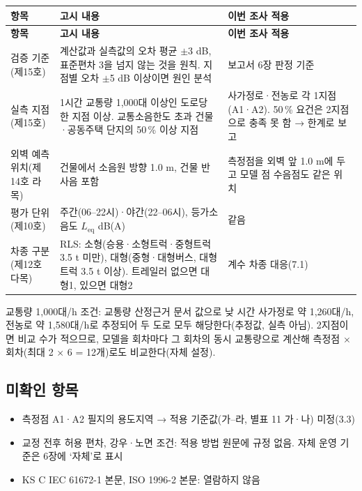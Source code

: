 \documentclass[10.5pt,a4paper]{article}
\newcommand{\hd}[1]{\cellcolor{headfill}\textbf{\sffamily #1}}
\newcommand{\notebox}[2][lab]{\par\noindent\colorbox{#1}{\parbox{\dimexpr\linewidth-2\fboxsep}{\small #2}}\par}
\begin{document}
\footnotesize
\begin{longtable}{>{\raggedright\arraybackslash}p{}>{\raggedright\arraybackslash}p{}>{\raggedright\arraybackslash}p{}}
\toprule
\hd{항목} & \hd{고시 내용} & \hd{이번 조사 적용} \\ \midrule
\endfirsthead
\toprule
\hd{항목} & \hd{고시 내용} & \hd{이번 조사 적용} \\ \midrule
\endhead
\bottomrule
\endlastfoot
검증 기준(제15호) & 계산값과 실측값의 오차 평균 $\pm$3 dB, 표준편차 3을 넘지 않는 것을 원칙. 지점별 오차 $\pm$5 dB 이상이면 원인 분석 & 보고서 6장 판정 기준 \\ \midrule
실측 지점(제15호) & 1시간 교통량 1,000대 이상인 도로당 한 지점 이상. 교통소음한도 초과 건물·공동주택 단지의 50\,\% 이상 지점 & 사가정로·전농로 각 1지점(A1·A2). 50\,\% 요건은 2지점으로 충족 못 함 → 한계로 보고 \\ \midrule
외벽 예측 위치(제14호 라목) & 건물에서 소음원 방향 1.0 m, 건물 반사음 포함 & 측정점을 외벽 앞 1.0 m에 두고 모델 점 수음점도 같은 위치 \\ \midrule
평가 단위(제10호) & 주간(06--22시)·야간(22--06시), 등가소음도 $L_{\mathrm{eq}}$ dB(A) & 같음 \\ \midrule
차종 구분(제12호 다목) & RLS: 소형(승용·소형트럭·중형트럭 3.5 t 미만), 대형(중형·대형버스, 대형트럭 3.5 t 이상). 트레일러 없으면 대형1, 있으면 대형2 & 계수 차종 대응(7.1) \\
\end{longtable}
\addtocounter{table}{-1}
\normalsize
\notebox[inp]{교통량 1,000대/h 조건: 교통량 산정근거 문서 값으로 낮 시간 사가정로 약 1,260대/h, 전농로 약 1,580대/h로 추정되어 두 도로 모두 해당한다(추정값, 실측 아님). 2지점이면 비교 수가 적으므로, 모델을 회차마다 그 회차의 동시 교통량으로 계산해 측정점 $\times$ 회차(최대 2 $\times$ 6 = 12개)로도 비교한다(자체 설정).}
\subsection{미확인 항목}
\begin{itemize}
\item 측정점 A1·A2 필지의 용도지역 → 적용 기준값(가--라, 별표 11 가·나) 미정(3.3)
\item 교정 전후 허용 편차, 강우·노면 조건: 적용 방법 원문에 규정 없음. 자체 운영 기준은 6장에 `자체'로 표시
\item KS C IEC 61672-1 본문, ISO 1996-2 본문: 열람하지 않음
\end{itemize}
\end{document}
